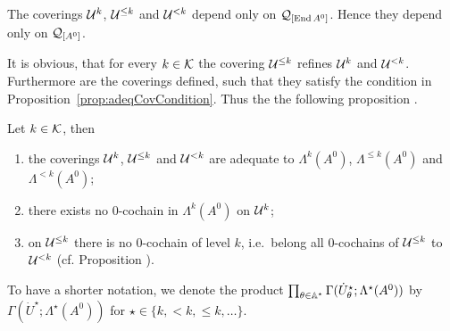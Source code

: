 \begin{rem}
  The coverings $\mathcal{U}^{k}$, $\mathcal{U}^{\leq k}$ and $\mathcal{U}^{<k}$ depend only on
  $\mathcal{Q}_{[\operatorname{End} A^0]}$. Hence they depend only on $\mathcal{Q}_{[A^0]}$.
\end{rem}
It is obvious, that for every $k\in\mathcal{K}$ the covering $\mathcal{U}^{\leq k}$ refines
$\mathcal{U}^{k}$ and $\mathcal{U}^{<k}$.
Furthermore are the coverings defined, such that they satisfy the
condition in Proposition~\ref{prop:adeqCovCondition}.
Thus the  the following proposition .
\begin{prop}\label{prop:adequateProperties}
  Let $k\in\mathcal{K}$, then
  \begin{enumerate}
    \item the coverings $\mathcal{U}^{k}$, $\mathcal{U}^{\leq k}$ and $\mathcal{U}^{<k}$ are adequate
      to $\Lambda^k(A^0)$, $\Lambda^{\leq k}(A^0)$ and $\Lambda^{<k}(A^0)$;
    \item there exists no $0$-cochain in $\Lambda^k(A^0)$ on $\mathcal{U}^k$;
    \item on $\mathcal{U}^{\leq k}$ there is no $0$-cochain of level $k$, i.e.\ belong
      all $0$-cochains of  $\mathcal{U}^{\leq k}$ to $\mathcal{U}^{<k}$
      (cf. Proposition \cite[Prop.II.3.1 (iv)]{Loday1994}).
  \end{enumerate}
\end{prop}
\begin{comment}
  \begin{proof}
    \begin{enumerate}
      \item This is clear, since the coverings are build to satisfy the
        condition from proposition~\ref{prop:adeqCovCondition}.
      \item \PROBLEM{}
      \item \PROBLEM{}
    \end{enumerate}
  \end{proof}
\end{comment}
To have a shorter notation, we denote the product
$\prod_{\theta\in\mathbb{A}^\star}\Gamma(\dot U_\theta^\star;\Lambda^\star(A^0))$ by
$\Gamma(\dot U^\star;\Lambda^\star(A^0))$ for $\star\in\{k,<k,\leq k,\dots\}$.

